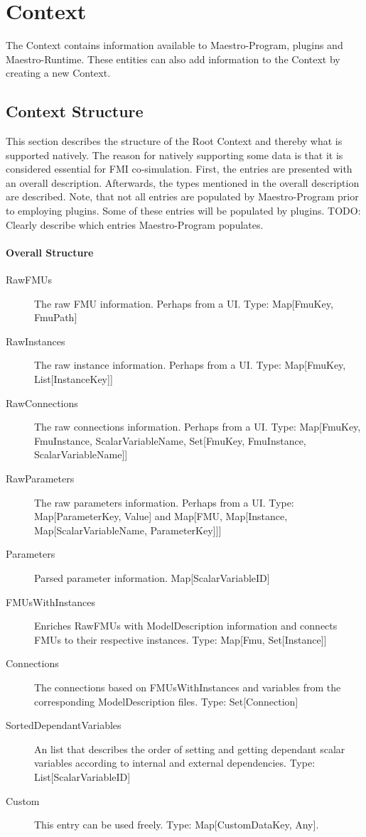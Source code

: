 \section{Context}
The Context contains information available to Maestro-Program,
plugins and Maestro-Runtime. These entities can also add information to the
Context by creating a new Context.

\subsection{Context Structure}
This section describes the structure of the Root Context and thereby what is
supported natively. The reason for natively supporting some data is that it is
considered essential for FMI co-simulation.
First, the entries are presented with an overall description. Afterwards, the types
mentioned in the overall description are described. Note, that not all entries are populated
by Maestro-Program prior to employing plugins. Some of these entries will be
populated by plugins. TODO: Clearly describe which entries Maestro-Program
populates.
\paragraph{Overall Structure}
\begin{description}
  \item[RawFMUs] The raw FMU information. Perhaps from a UI. Type: Map[FmuKey, FmuPath]
  \item[RawInstances] The raw instance information. Perhaps from a UI. Type: Map[FmuKey, List[InstanceKey]]
  \item[RawConnections] The raw connections information. Perhaps from a UI.
    Type: Map[{FmuKey, FmuInstance, ScalarVariableName}, Set[{FmuKey, FmuInstance, ScalarVariableName}]]
  \item[RawParameters] The raw parameters information. Perhaps from a UI.
    Type: Map[ParameterKey, Value] and Map[FMU, Map[Instance,
    Map[ScalarVariableName, ParameterKey]]]
  \item[Parameters] Parsed parameter information. Map[ScalarVariableID]
  \item[FMUsWithInstances] Enriches RawFMUs with ModelDescription information
    and connects FMUs to their respective instances. Type: Map[Fmu, Set[Instance]]
  \item[Connections] The connections based on FMUsWithInstances and variables
    from the corresponding ModelDescription files. Type: Set[Connection]
  \item[SortedDependantVariables] An list that describes the order of setting
    and getting dependant scalar variables according to internal and external
    dependencies. Type: List[ScalarVariableID]
    \item[Custom] This entry can be used freely. Type: Map[CustomDataKey, Any].
\end{description}

